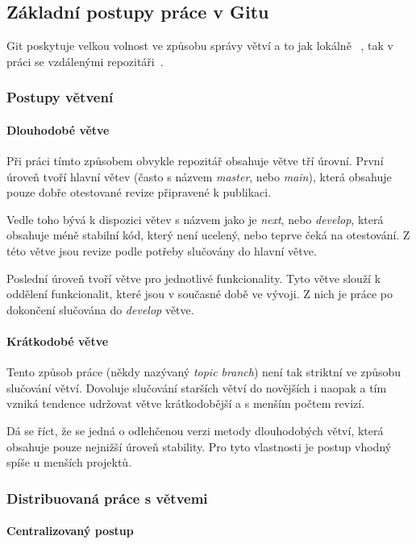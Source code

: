 \documentclass[
  biblatex,
  glossaries,
  index
]{kidiplom}
\begin{document}
\subsection{Základní postupy práce v Gitu}
Git poskytuje velkou volnost ve způsobu správy větví a to jak lokálně~\cite{gitreference-local} , tak v práci se vzdálenými repozitáři~\cite{gitreference-distributed}.

\subsubsection{Postupy větvení}
\paragraph*{Dlouhodobé větve}
Při práci tímto způsobem obvykle repozitář obsahuje větve tří úrovní. První úroveň tvoří hlavní větev (často s názvem {\it master}, nebo {\it main}), která obsahuje pouze dobře otestované revize připravené k publikaci.

Vedle toho bývá k dispozici větev s názvem jako je {\it next}, nebo {\it develop}, která obsahuje méně stabilní kód, který není ucelený, nebo teprve čeká na otestování. Z této větve jsou revize podle potřeby slučovány do hlavní větve.

Poslední úroveň tvoří větve pro jednotlivé funkcionality. Tyto větve slouží k oddělení funkcionalit, které jsou v současné době ve vývoji. Z nich je práce po dokončení slučována do {\it develop} větve.

\paragraph*{Krátkodobé větve}
Tento způsob práce (někdy nazývaný {\it topic branch}) není tak striktní ve způsobu slučování větví. Dovoluje slučování starších větví do novějších i naopak a tím vzniká tendence udržovat větve krátkodobější a s menším počtem revizí.

Dá se říct, že se jedná o odlehčenou verzi metody dlouhodobých větví, která obsahuje pouze nejnižší úroveň stability. Pro tyto vlastnosti je postup vhodný spíše u menších projektů.

\subsubsection{Distribuovaná práce s větvemi}
\paragraph*{Centralizovaný postup}
\end{document}
